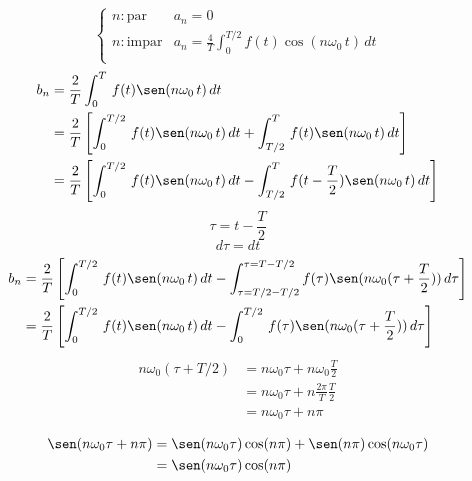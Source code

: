 \begin{equation}
\begin{cases}
    n:\text{par}&a_n=0\\
    n:\text{impar}&a_n=\frac{4}{T}\int_0^{T/2}f(t)\cos(n\omega_0\,t)\,dt\\
\end{cases}
\end{equation}
\begin{equation*}
\begin{split}
    b_n
        &=\frac{2}{T}\int_0^T\,f(t)\sen(n\omega_0\,t)\,dt\\
        &=\frac{2}{T}\left[
            \int_0^{T/2}\,f(t)\sen(n\omega_0\,t)\,dt+
            \int_{T/2}^T\,f(t)\sen(n\omega_0\,t)\,dt
        \right]\\
        &=\frac{2}{T}\left[
            \int_0^{T/2}\,f(t)\sen(n\omega_0\,t)\,dt-
            \int_{T/2}^T\,f(t-\frac{T}{2})\sen(n\omega_0\,t)\,dt
        \right]\\
\end{split}
\end{equation*}
\begin{equation*}
    \tau=t-\frac{T}{2}
\end{equation*}
\begin{equation*}
    d\tau=dt
\end{equation*}
\begin{equation*}
\begin{split}
    b_n
        &=\frac{2}{T}\left[
            \int_0^{T/2}\,f(t)\sen(n\omega_0\,t)\,dt-
            \int_{\tau=T/2-T/2}^{\tau=T-T/2}
                f(\tau)\sen(n\omega_0(\tau+\frac{T}{2}))\,d\tau
        \right]\\
        &=\frac{2}{T}\left[
            \int_0^{T/2}\,f(t)\sen(n\omega_0\,t)\,dt-
            \int_0^{T/2}\,f(\tau)\sen(n\omega_0(\tau+\frac{T}{2}))\,d\tau
        \right]\\
\end{split}
\end{equation*}
\begin{equation*}
\begin{split}
    n\omega_0(\tau+T/2)
        &=n\omega_0\tau+n\omega_0\frac{T}{2}\\
        &=n\omega_0\tau+n\frac{2\pi}{T}\frac{T}{2}\\
        &=n\omega_0\tau+n\pi\\
\end{split}
\end{equation*}
\begin{equation*}
\begin{split}
    \sen(n\omega_0\tau+n\pi)
        &=\sen(n\omega_0\tau)\cos(n\pi)+\sen(n\pi)\cos(n\omega_0\tau)\\
        &=\sen(n\omega_0\tau)\cos(n\pi)\\
\end{split}
\end{equation*}
